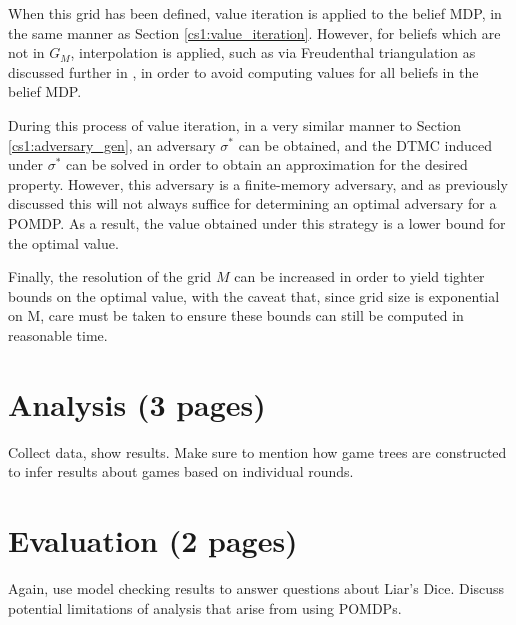 When this grid has been defined, value iteration is applied to the belief MDP, in the same manner as Section \ref{cs1:value_iteration}. However, for beliefs which are not in $G_M$, interpolation is applied, such as via Freudenthal triangulation as discussed further in \cite{lovejoy_computationally_1991}, in order to avoid computing values for all beliefs in the belief MDP.

During this process of value iteration, in a very similar manner to Section \ref{cs1:adversary_gen}, an adversary $\sigma^*$ can be obtained, and the DTMC induced under $\sigma^*$ can be solved in order to obtain an approximation for the desired property. However, this adversary is a finite-memory adversary, and as previously discussed this will not always suffice for determining an optimal adversary for a POMDP. As a result, the value obtained under this strategy is a lower bound for the optimal value.

Finally, the resolution of the grid $M$ can be increased in order to yield tighter bounds on the optimal value, with the caveat that, since grid size is exponential on M, care must be taken to ensure these bounds can still be computed in reasonable time.

\section{Analysis (3 pages)}

Collect data, show results. Make sure to mention how game trees are constructed to infer results about games based on individual rounds.


\section{Evaluation (2 pages)}

Again, use model checking results to answer questions about Liar's Dice. Discuss potential limitations of analysis that arise from using POMDPs.

